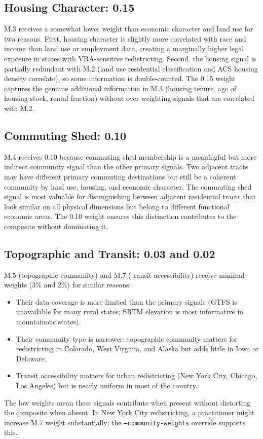 \subsection{Housing Character: 0.15}

M.3 receives a somewhat lower weight than economic character and land use
for two reasons.
First, housing character is slightly more correlated with race and income
than land use or employment data, creating a marginally higher legal exposure
in states with VRA-sensitive redistricting.
Second, the housing signal is partially redundant with M.2 (land use residential
classification and ACS housing density correlate), so some information is
double-counted.
The 0.15 weight captures the genuine additional information in M.3 (housing
tenure, age of housing stock, rental fraction) without over-weighting signals
that are correlated with M.2.

\subsection{Commuting Shed: 0.10}

M.4 receives 0.10 because commuting shed membership is a meaningful but
more indirect community signal than the other primary signals.
Two adjacent tracts may have different primary commuting destinations but
still be a coherent community by land use, housing, and economic character.
The commuting shed signal is most valuable for distinguishing between
adjacent residential tracts that look similar on all physical dimensions
but belong to different functional economic areas.
The 0.10 weight ensures this distinction contributes to the composite
without dominating it.

\subsection{Topographic and Transit: 0.03 and 0.02}

M.5 (topographic community) and M.7 (transit accessibility) receive minimal
weights (3\% and 2\%) for similar reasons:
\begin{itemize}
  \item Their data coverage is more limited than the primary signals
    (GTFS is unavailable for many rural states; SRTM elevation is most
    informative in mountainous states).
  \item Their community type is narrower: topographic community matters
    for redistricting in Colorado, West Virginia, and Alaska but adds
    little in Iowa or Delaware.
  \item Transit accessibility matters for urban redistricting (New York City,
    Chicago, Los Angeles) but is nearly uniform in most of the country.
\end{itemize}
The low weights mean these signals contribute when present without distorting
the composite when absent.
In New York City redistricting, a practitioner might increase M.7 weight
substantially; the \texttt{--community-weights} override supports this.

